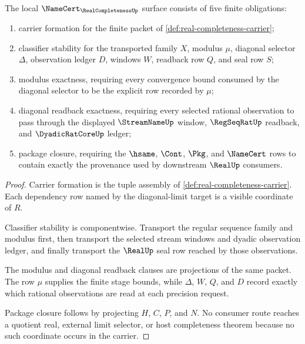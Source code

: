 \begin{theorem}
\label{thm:real-completeness-namecert-obligations}
The local $\NameCert_{\RealCompletenessUp}$ surface consists of five finite obligations:
\begin{enumerate}
\item carrier formation for the finite packet of \autoref{def:real-completeness-carrier};
\item classifier stability for the transported family $X$, modulus $\mu$, diagonal selector $\Delta$, observation ledger $D$, windows $W$, readback row $Q$, and seal row $S$;
\item modulus exactness, requiring every convergence bound consumed by the diagonal selector to be the explicit row recorded by $\mu$;
\item diagonal readback exactness, requiring every selected rational observation to pass through the displayed $\StreamNameUp$ window, $\RegSeqRatUp$ readback, and $\DyadicRatCoreUp$ ledger;
\item package closure, requiring the $\hsame$, $\Cont$, $\Pkg$, and $\NameCert$ rows to contain exactly the provenance used by downstream $\RealUp$ consumers.
\end{enumerate}
\end{theorem}
\begin{proof}
Carrier formation is the tuple assembly of \autoref{def:real-completeness-carrier}. Each dependency row named by the diagonal-limit target is a visible coordinate of $R$.

Classifier stability is componentwise. Transport the regular sequence family and modulus first, then transport the selected stream windows and dyadic observation ledger, and finally transport the $\RealUp$ seal row reached by those observations.

The modulus and diagonal readback clauses are projections of the same packet. The row $\mu$ supplies the finite stage bounds, while $\Delta$, $W$, $Q$, and $D$ record exactly which rational observations are read at each precision request.

Package closure follows by projecting $H$, $C$, $P$, and $N$. No consumer route reaches a quotient real, external limit selector, or host completeness theorem because no such coordinate occurs in the carrier.
\end{proof}

